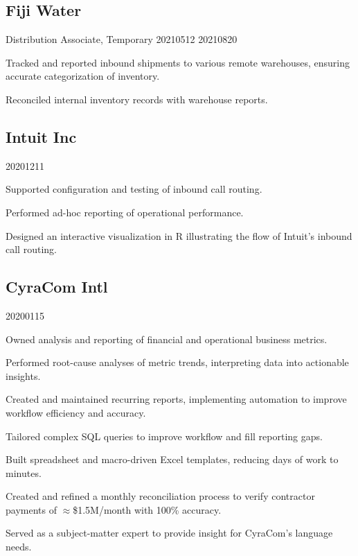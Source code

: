 \subsection{Fiji Water}
\experienceitem
    {Distribution Associate, Temporary
    }
    {2021}{05}{12}
    {2021}{08}{20}{

    Tracked and reported inbound shipments to various remote
    warehouses, ensuring accurate categorization of inventory.

    Reconciled internal inventory records with warehouse reports.
}



\subsection{Intuit Inc}
     {2020}{12}{11}{

    Supported configuration and testing of inbound call routing.

    Performed ad-hoc reporting of operational performance.
    
    Designed an interactive visualization in R illustrating the flow of
    Intuit's inbound call routing.
    }

\subsection{CyraCom Intl}
     {2020}{01}{15}{

    Owned analysis and reporting of financial and operational business metrics.

    Performed root-cause analyses of metric trends, interpreting data into
    actionable insights.

    Created and maintained recurring reports, implementing automation
    to improve workflow efficiency and accuracy.

    Tailored complex SQL queries to improve workflow and fill reporting gaps.
    
    Built spreadsheet and macro-driven Excel templates, reducing days of work to
    minutes.

    Created and refined a monthly reconciliation process to verify contractor
    payments of $\approx$\$1.5M/month with 100\% accuracy.

    Served as a subject-matter expert to provide insight for CyraCom's language
    needs.
    }

